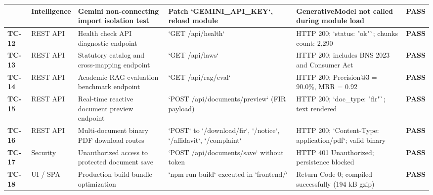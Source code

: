 \begin{longtable}{p{1.2cm}p{2.6cm}p{3.8cm}p{2.8cm}p{3.0cm}c}
\begin{longtable}{p{1.2cm}p{2.6cm}p{3.8cm}p{2.8cm}p{3.0cm}c}
\midrule
\textbf{TC-11} & Intelligence & Gemini non-connecting import isolation test & Patch `GEMINI_API_KEY`, reload module & GenerativeModel not called during module load & \textbf{PASS} \\
\midrule
\textbf{TC-12} & REST API & Health check API diagnostic endpoint & `GET /api/health` & HTTP 200; `status: "ok"`; chunks count: 2,290 & \textbf{PASS} \\
\midrule
\textbf{TC-13} & REST API & Statutory catalog and cross-mapping endpoint & `GET /api/laws` & HTTP 200; includes BNS 2023 and Consumer Act & \textbf{PASS} \\
\midrule
\textbf{TC-14} & REST API & Academic RAG evaluation benchmark endpoint & `GET /api/rag/eval` & HTTP 200; Precision@3 = 90.0\%, MRR = 0.92 & \textbf{PASS} \\
\midrule
\textbf{TC-15} & REST API & Real-time reactive document preview endpoint & `POST /api/documents/preview` (FIR payload) & HTTP 200; `doc_type: "fir"`; text rendered & \textbf{PASS} \\
\midrule
\textbf{TC-16} & REST API & Multi-document binary PDF download routes & `POST` to `/download/fir`, `/notice`, `/affidavit`, `/complaint` & HTTP 200; `Content-Type: application/pdf`; valid binary & \textbf{PASS} \\
\midrule
\textbf{TC-17} & Security & Unauthorized access to protected document save & `POST /api/documents/save` without token & HTTP 401 Unauthorized; persistence blocked & \textbf{PASS} \\
\midrule
\textbf{TC-18} & UI / SPA & Production build bundle optimization & `npm run build` executed in `frontend/` & Return Code 0; compiled successfully (194 kB gzip) & \textbf{PASS} \\
\bottomrule
\end{longtable}
